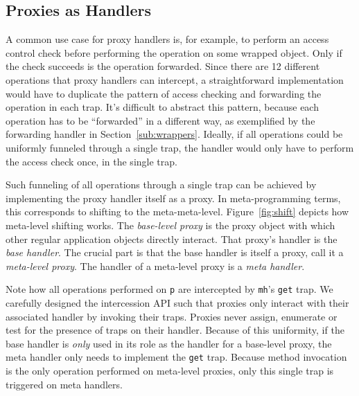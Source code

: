\documentclass{sig-alternate}
\begin{document}
\subsection{Proxies as Handlers}
\label{sub:doublelifting}

A common use case for proxy handlers is, for example, to perform an access control check before performing the operation on some wrapped object. Only if the check succeeds is the operation forwarded. Since there are 12 different operations that proxy handlers can intercept, a straightforward implementation would have to duplicate the pattern of access checking and forwarding the operation in each trap. It's difficult to abstract this pattern, because each operation has to be ``forwarded'' in a different way, as exemplified by the forwarding handler in Section~\ref{sub:wrappers}. Ideally, if all operations could be uniformly funneled through a single trap, the handler would only have to perform the access check once, in the single trap.

Such funneling of all operations through a single trap can be achieved by implementing the proxy handler itself as a proxy. In meta-programming terms, this corresponds to shifting to the meta-meta-level.
Figure~\ref{fig:shift} depicts how meta-level shifting works. The \emph{base-level proxy} is the proxy object with which other regular application objects directly interact. That proxy's handler is the \emph{base handler}. The crucial part is that the base handler is itself a proxy, call it a \emph{meta-level proxy}. The handler of a meta-level proxy is a \emph{meta handler}.

Note how all operations performed on \texttt{p} are intercepted by \texttt{mh}'s \texttt{get} trap.
We carefully designed the intercession API such that proxies only interact with their associated handler by invoking their traps. Proxies never assign, enumerate or test for the presence of traps on their handler. Because of this uniformity, if the base handler is \emph{only} used in its role as the handler for a base-level proxy, the meta handler only needs to implement the \texttt{get} trap. Because method invocation is the only operation performed on meta-level proxies, only this single trap is triggered on meta handlers.
\end{document}
